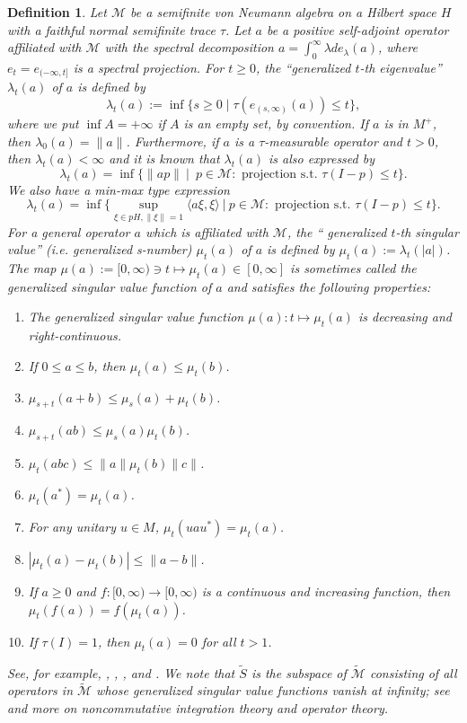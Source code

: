 \documentclass[a4paper,12pt]{amsart}
\newtheorem{definition}{Definition}[section]
\newcommand{\M}{\mathcal{M}}
\begin{document}
\begin{definition} \rm Let $\M$ be a semifinite von Neumann algebra on a Hilbert space $H$ with a faithful normal semifinite trace $\tau$.  
Let  $a$ be a positive self-adjoint operator affiliated with $\M$ with the spectral decomposition $a =  \int_0^{\infty} \lambda d e_{\lambda}(a)$, 
where $e_t = e_{(-\infty,t]}$ is a spectral projection. 
For $t \geq 0$, the ``generalized $t$-th eigenvalue''
$\lambda_t(a)$ of $a$ is defined by 
$$
\lambda_t(a) := \inf \{s \geq 0 \; |\; \tau(e_{(s, \infty)}(a)) \leq t \} , 
$$
where we put $\inf A = + \infty$ if $A$ is an empty set, by convention.  If $a$ is in $M^+$, then $\lambda_0(a) = \|a \|$. 
Furthermore, if $a$ is a  $\tau$-measurable operator and $t > 0$, then $\lambda_t(a) < \infty$ and it is known that 
$\lambda_t(a)$ is also expressed by 
$$
\lambda_t(a) = \inf \{\|ap\| \ |\; \  p \in \M : \text{ projection s.t. } \tau(I-p) \leq t\}. 
$$
We also have a min-max type expression 
$$
\lambda_t(a) = \inf \{\sup _{\xi \in pH, \| \xi \| = 1} \langle a\xi,\xi \rangle  \ | \  p \in \M : \text{ projection s.t. } \tau(I-p) \leq t\}. 
$$
For a general  operator $a$ which is affiliated with $\M$, 
the `` generalized $t$-th singular value''  (i.e. generalized s-number)   
$\mu_t(a)$ of $a$ is defined by 
$\mu_t(a) := \lambda_t(|a|) $.  The map $\mu(a) := [0,\infty) \ni t \mapsto \mu_t(a) \in [0,\infty]$ 
is sometimes called the generalized singular value function of $a$ and satisfies the following properties:
\begin{enumerate}
\item[(1)] The generalized singular value function $\mu(a):t \mapsto \mu_t(a)$ is decreasing and right-continuous. 
\item[(2)] If $0 \leq a \leq b$, then  $\mu_t(a) \leq  \mu_t(b)$. 
\item[(3)] $\mu_{s +t}(a+b) \leq  \mu_s(a)  + \mu_t(b)$. 
\item[(4)] $\mu_{s +t}(ab) \leq  \mu_s(a)  \mu_t(b)$. 
\item[(5)] $\mu_{t}(abc)  \leq \|a\|\mu_{t}(b) \|c\|$.
\item[(6)] $\mu_t(a^*) = \mu_t(a)$. 
\item[(7)] For any unitary $u \in M$, $\mu_t(uau^*) = \mu_t(a)$. 
\item[(8)] $|\mu_t(a) - \mu_t(b)| \leq \|a-b\|$.
\item[(9)] If $a \geq 0$ and $f: [0,\infty) \rightarrow [0,\infty)$ is a continuous and increasing function, then 
$\mu_t(f(a)) = f(\mu_t(a))$. 
\item[(10)] If $\tau (I) = 1$, then $\mu_t(a) = 0$ for all $t >1$. 
\end{enumerate}
See, for example, \cite{F-K}, \cite{fan}, \cite{L-S-Z}, and \cite{ovchinnikov}. 
We note that $\tilde{S}$ is the subspace of $\tilde{\M}$ 
consisting of all operators in $\tilde{\M}$ whose generalized singular value functions vanish at infinity; see \cite{D-P} and 
\cite{D-P-S} more on noncommutative integration theory and operator theory.


\end{definition}
\end{document}
